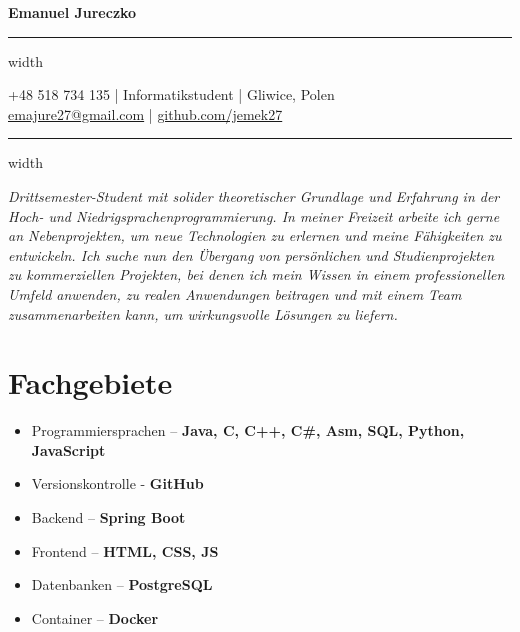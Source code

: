 \documentclass[11pt,letterpaper]{article}
\newcommand{\name}[1]{
  \begin{center}
    \Huge\textbf{#1}
  \end{center}
  \vspace{-0.5em}
  \hrule height 0.4pt width \textwidth
  \vspace{0.5em}
}
\newcommand{\contact}[5]{
  \begin{center}
    #1 | #2 | #3 \\
    #4 | #5
  \end{center}
  \vspace{-0.5em}
  \hrule height 0.4pt width \textwidth
  \vspace{0.5em}
}
\newcommand{\spacedSection}[1]{
  \vspace{0.1em}
  \section{#1}
  \vspace{1em}
}
\begin{document}
\name{Emanuel Jureczko}
\vspace{-0.5em}
\contact{+48 518 734 135}{Informatikstudent}{Gliwice, Polen}
{\href{mailto:emajure27@gmail.com}{emajure27@gmail.com}}{\href{https://github.com/jemek27}{github.com/jemek27}}

\vspace{-0.5em}
\begin{justify}
\textit{Drittsemester-Student mit solider theoretischer Grundlage und Erfahrung in der Hoch- und Niedrigsprachenprogrammierung.
In meiner Freizeit arbeite ich gerne an Nebenprojekten, um neue Technologien zu erlernen und meine Fähigkeiten zu entwickeln.
Ich suche nun den Übergang von persönlichen und Studienprojekten zu kommerziellen Projekten, bei denen ich mein Wissen
in einem professionellen Umfeld anwenden, zu realen Anwendungen beitragen und mit einem Team zusammenarbeiten kann, um wirkungsvolle Lösungen zu liefern.}
\end{justify}

\spacedSection{Fachgebiete}

\begin{minipage}[t]{0.33\textwidth}
    \begin{flushleft}
        \begin{itemize}[leftmargin=0.5cm]
            \setlength\itemsep{0.4em}
            \item Programmiersprachen – \textbf{Java, C, C++, C\#, Asm, SQL, Python, JavaScript}
            \item Versionskontrolle - \textbf{GitHub}
        \end{itemize}
    \end{flushleft}
\end{minipage}
\begin{minipage}[t]{0.33\textwidth}
    \begin{flushleft}
        \begin{itemize}[leftmargin=0.5cm]
        \setlength\itemsep{0.4em}
            \item Backend – \textbf{Spring Boot}
            \item Frontend – \textbf{HTML, CSS, JS}
        \end{itemize}
    \end{flushleft}
\end{minipage}
\begin{minipage}[t]{0.33\textwidth}
    \begin{flushleft}
        \begin{itemize}[leftmargin=0.5cm]
        \setlength\itemsep{0.4em}
            \item Datenbanken – \textbf{PostgreSQL}
            \item Container – \textbf{Docker}
        \end{itemize}
    \end{flushleft}
\end{minipage}
\end{document}

